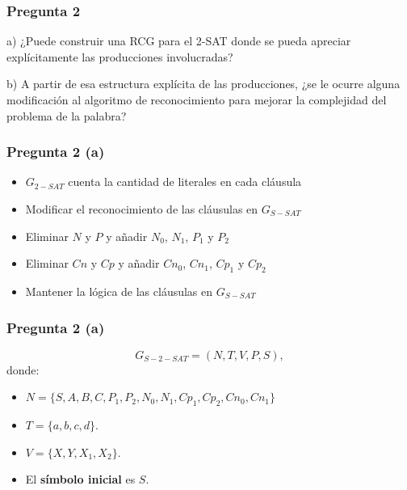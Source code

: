 \documentclass{beamer}
\begin{document}
\begin{frame}
    \frametitle{Pregunta 2}
    
    a) ¿Puede construir una RCG para el 2-SAT donde se pueda apreciar explícitamente las producciones involucradas?
    
    b) A partir de esa estructura explícita de las producciones, ¿se le ocurre alguna modificación al algoritmo de reconocimiento para mejorar la complejidad del problema de la palabra?
\end{frame}

\begin{frame}
    \frametitle{Pregunta 2 (a)}
    
    \begin{itemize}
        \item $G_{2-SAT}$ cuenta la cantidad de literales en cada cláusula
              \pause
        \item Modificar el reconocimiento de las cláusulas en $G_{S-SAT}$
              \pause
        \item Eliminar $N$ y $P$ y añadir $N_0$, $N_1$, $P_1$ y $P_2$
              \pause
        \item Eliminar $Cn$ y $Cp$ y añadir $Cn_0$, $Cn_1$, $Cp_1$ y $Cp_2$
              \pause
        \item Mantener la lógica de las cláusulas en $G_{S-SAT}$
    \end{itemize}
\end{frame}

\begin{frame}
    \frametitle{Pregunta 2 (a)}
    
    \[
        G_{S-2-SAT} = (N, T, V, P, S),
    \]
    donde:
    
    \begin{itemize}
        \item $N=\{S,A,B,C,P_1,P_2,N_0,N_1,Cp_1,Cp_2,Cn_0,Cn_1\}$
        \item $T=\{a,b,c,d\}$.
        \item $V=\{X,Y,X_1,X_2\}$.
        \item El \textbf{símbolo inicial} es $S$.
    \end{itemize}
\end{frame}
\end{document}
